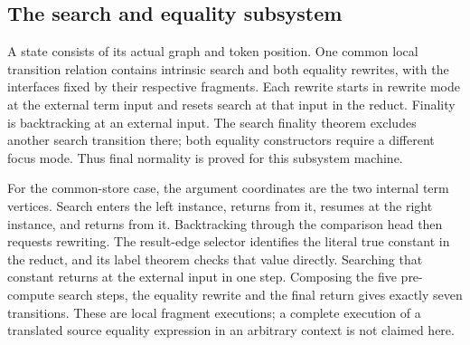 


\subsection{The search and equality subsystem}

A state consists of its actual graph and token position. One common local
transition relation contains intrinsic search and both equality rewrites,
with the interfaces fixed by their respective fragments. Each rewrite
starts in rewrite mode at the external term input and resets search at
that input in the reduct. Finality is backtracking at an external input.
The search finality theorem excludes another search transition there;
both equality constructors require a different focus mode. Thus final
normality is proved for this subsystem machine.





For the common-store case, the argument coordinates
are the two internal term vertices. Search enters the left instance, returns
from it, resumes at the right instance, and returns from it. Backtracking
through the comparison head then requests rewriting. The result-edge
selector identifies the literal true constant in the reduct, and its label
theorem checks that value directly. Searching that constant returns at the
external input in one step. Composing the five pre-compute search steps,
the equality rewrite and the final return gives exactly seven transitions.
These are local fragment executions; a complete execution of a translated
source equality expression in an arbitrary context is not claimed here.



